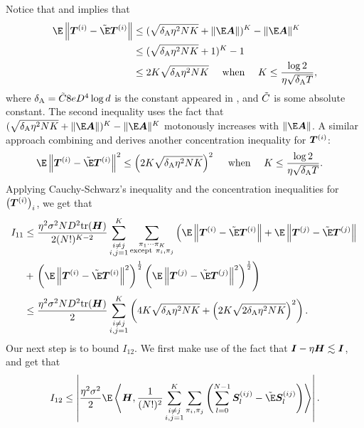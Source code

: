Notice that  and  implies that 
\begin{align*}
    \E\left\|\mT^{(i)}-\fakeE\mT^{(i)}\right\| &\leq (\sqrt{\deltaA \eta^2NK}+\|\E\mA\|)^K - \|\E\mA\|^K \\
    &\leq (\sqrt{\deltaA \eta^2NK}+1)^K - 1 \\
    &\leq 2K\sqrt{\deltaA \eta^2NK} ~~~~ \text{when} ~~~~K \leq \frac{\log 2}{\eta \sqrt{\deltaA T}},
\end{align*}
where $\delta_{\mathrm{A}} = \Tilde{C}8eD^4 \log d$ is the constant appeared in , and $\Tilde{C}$ is some absolute constant. The second inequality uses the fact that $(\sqrt{\deltaA \eta^2NK}+\|\E\mA\|)^K - \|\E\mA\|^K$ motonously increases with $\|\E\mA\|$.
A similar approach combining  and  derives another concentration inequality for ${\bm{T}}^{(i)}$:
\begin{align*}
    \E\left\|\mT^{(i)}-\fakeE\mT^{(i)}\right\|^2 &\leq \left(2K\sqrt{\deltaA \eta^2NK}\right)^2 ~~~~ \text{when} ~~~~K \leq \frac{\log 2}{\eta \sqrt{\deltaA T}}.
\end{align*}
Applying Cauchy-Schwarz's inequality and the concentration inequalities for $\left({\bm{T}}^{(i)}\right)_i$, we get that 
\begin{align*}       
    I_{11}
    &\leq \frac{\eta^2\sigma^2ND^2\text{tr}(\mH)}{2(N!)^{K-2}}\sum_{\substack{i\neq j \\i,j=1}}^K\sum_{\substack{\pi_1\cdots \pi_K \\ \text{except} ~\pi_i, \pi_j}}\left(\E\left\|\mT^{(i)}-\fakeE\mT^{(i)}\right\|+\E\left\|\mT^{(j)}-\fakeE\mT^{(j)}\right\|\right. \\
    &+\left.\left(\E\left\|\mT^{(i)}-\fakeE\mT^{(i)}\right\|^2\right)^{\frac{1}{2}}\left(\E\left\|\mT^{(j)}-\fakeE\mT^{(j)}\right\|^2\right)^{\frac{1}{2}}\right) \\
    &\leq\frac{\eta^2\sigma^2ND^2\text{tr}(\mH)}{2}\sum_{\substack{i\neq j \\i,j=1}}^K\left(4K\sqrt{\deltaA\eta^2NK}+\left(2K\sqrt{2\deltaA\eta^2NK}\right)^2\right).
\end{align*}
Our next step is to bound $I_{12}$. We first make use of the fact that ${\bm{I}}-\eta{\bm{H}}\lesssim{\bm{I}}$, and get that 
\begin{align*}
    I_{12}&\leq \left|\frac{\eta^2\sigma^2}{2}\E\inp{\mH}{\frac{1}{(N!)^2}\sum_{\substack{i\neq j \\i,j=1}}^K\sum_{\pi_i, \pi_j}\left(\sum_{l=0}^{N-1}\mS_l^{(ij)}-\fakeE \mS_l^{(ij)}\right)}\right|. \\
\end{align*}
